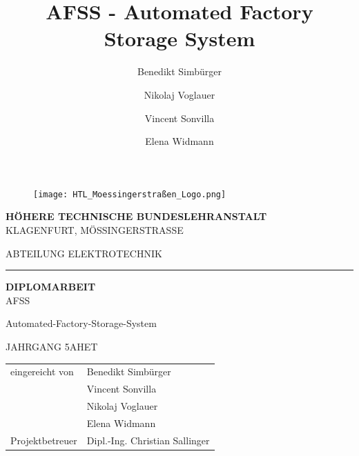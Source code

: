 \documentclass[12pt, twoside]{article}
\title{AFSS - Automated Factory Storage System}
\author{Benedikt Simbürger \\
    \and Nikolaj Voglauer \\
    \and Vincent Sonvilla \\
    \and Elena Widmann
    }
\begin{document}
\sloppy
{}

\setlength{\parindent}{0pt}

\begin{figure}[h]
    \vspace{-5mm}
    \texttt{[image: HTL\_Moessingerstraßen\_Logo.png]}
    \centering
\end{figure}

\begin{center}
    \Large \textbf{HÖHERE TECHNISCHE BUNDESLEHRANSTALT} \\
    \vspace{5mm}
    \Large{KLAGENFURT, MÖSSINGERSTRASSE}

\end{center}

\vspace{7mm}

\begin{center}
    \Large{ABTEILUNG ELEKTROTECHNIK}
\end{center}

\hrule

\vspace{10mm}

\begin{center}
    \Huge \textbf{DIPLOMARBEIT} \\
    \vspace{7mm}
    \huge{AFSS}

    \vspace{7mm}
    \huge{Automated-Factory-Storage-System}

    \vspace{7mm}
    \Large{JAHRGANG 5AHET}

\end{center}

\vspace{15mm}

\begin{flushleft}
    \linespread{1}
    \bgroup
        \large
        \def\arraystretch{1.5}
        \begin{tabular}{p{5cm}l}
            eingereicht von & Benedikt Simbürger\\
            & Vincent Sonvilla\\
            & Nikolaj Voglauer\\
            & Elena Widmann\\
            Projektbetreuer & Dipl.-Ing. Christian Sallinger
        \end{tabular}
    \egroup
\end{flushleft}
\end{document}
